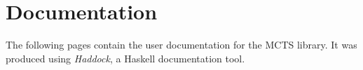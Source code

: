 \documentclass[12pt,twoside,notitlepage]{report}
\theoremstyle{definition}
\begin{document}
\setcounter{page}{1}
\pagestyle{headings}


\cleardoublepage

\cleardoublepage

\cleardoublepage

\cleardoublepage

\cleardoublepage





\cleardoublepage

\appendix


\chapter{Documentation\label{sec:docs}}
The following pages contain the user documentation for the MCTS library. It was produced using \textit{Haddock}, a Haskell documentation tool.




\end{document}
